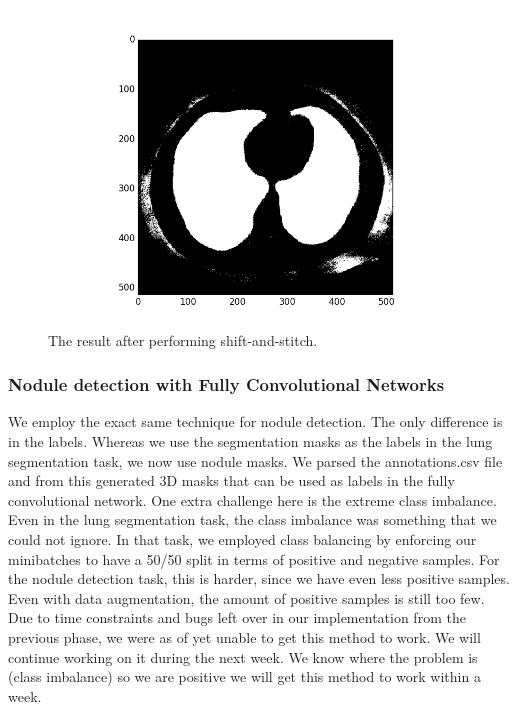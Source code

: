 \documentclass{article}
\begin{document}
\begin{figure}
    \centering
    \includegraphics[width=\linewidth]{best_wel_prima.png}
    \caption{The result after performing shift-and-stitch.}
    \label{bestwelprima}
\end{figure}

\subsubsection{Nodule detection with Fully Convolutional Networks}
We employ the exact same technique for nodule detection. The only difference is in the labels. Whereas we use the segmentation masks as the labels in the lung segmentation task, we now use nodule masks. We parsed the annotations.csv file and from this generated 3D masks that can be used as labels in the fully convolutional network. One extra challenge here is the extreme class imbalance. Even in the lung segmentation task, the class imbalance was something that we could not ignore. In that task, we employed class balancing by enforcing our minibatches to have a 50/50 split in terms of positive and negative samples. For the nodule detection task, this is harder, since we have even less positive samples. Even with data augmentation, the amount of positive samples is still too few. Due to time constraints and bugs left over in our implementation from the previous phase, we were as of yet unable to get this method to work. We will continue working on it during the next week. We know where the problem is (class imbalance) so we are positive we will get this method to work within a week.
\end{document}
